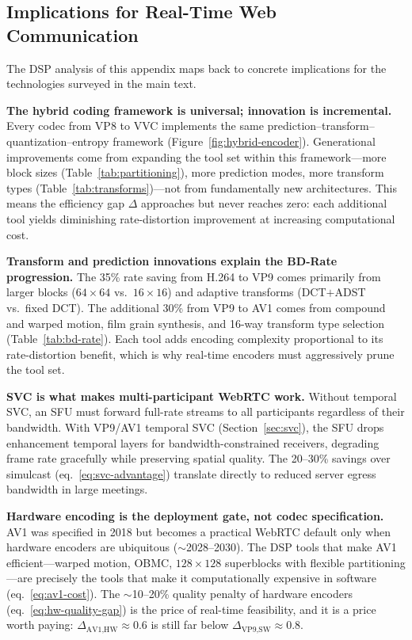 \subsection{Implications for Real-Time Web Communication}
\label{sec:video-implications}

The DSP analysis of this appendix maps back to concrete implications for
the technologies surveyed in the main text.

\textbf{The hybrid coding framework is universal; innovation is
incremental.} Every codec from VP8 to VVC implements the same
prediction--transform--quantization--entropy framework
(Figure~\ref{fig:hybrid-encoder}). Generational improvements come from
expanding the tool set within this framework---more block sizes
(Table~\ref{tab:partitioning}), more prediction modes, more transform
types (Table~\ref{tab:transforms})---not from fundamentally new
architectures. This means the efficiency gap $\Delta$ approaches but never
reaches zero: each additional tool yields diminishing rate-distortion
improvement at increasing computational cost.

\textbf{Transform and prediction innovations explain the BD-Rate
progression.} The 35\% rate saving from H.264 to VP9 comes primarily from
larger blocks ($64\!\times\!64$ vs.\ $16\!\times\!16$) and adaptive
transforms (DCT$+$ADST vs.\ fixed DCT). The additional 30\% from VP9 to
AV1 comes from compound and warped motion, film grain synthesis, and
16-way transform type selection (Table~\ref{tab:bd-rate}). Each tool adds
encoding complexity proportional to its rate-distortion benefit, which is
why real-time encoders must aggressively prune the tool set.

\textbf{SVC is what makes multi-participant WebRTC work.} Without temporal
SVC, an SFU must forward full-rate streams to all participants regardless
of their bandwidth. With VP9/AV1 temporal SVC
(Section~\ref{sec:svc}), the SFU drops enhancement temporal layers for
bandwidth-constrained receivers, degrading frame rate gracefully while
preserving spatial quality. The 20--30\% savings over simulcast
(eq.~\ref{eq:svc-advantage}) translate directly to reduced server egress
bandwidth in large meetings.

\textbf{Hardware encoding is the deployment gate, not codec specification.}
AV1 was specified in 2018 but becomes a practical WebRTC default only
when hardware encoders are ubiquitous (${\sim}$2028--2030). The DSP tools
that make AV1 efficient---warped motion, OBMC, $128\!\times\!128$
superblocks with flexible partitioning---are precisely the tools that make
it computationally expensive in software (eq.~\ref{eq:av1-cost}). The
${\sim}$10--20\% quality penalty of hardware encoders
(eq.~\ref{eq:hw-quality-gap}) is the price of real-time feasibility, and
it is a price worth paying: $\Delta_{\text{AV1,HW}} \approx 0.6$ is still
far below $\Delta_{\text{VP9,SW}} \approx 0.8$.

